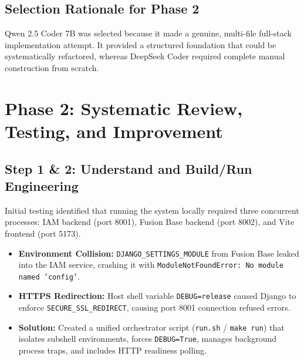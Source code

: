 \documentclass[11pt,a4paper]{article}
\begin{document}
\subsection{Selection Rationale for Phase 2}
Qwen 2.5 Coder 7B was selected because it made a genuine, multi-file full-stack implementation attempt. It provided a structured foundation that could be systematically refactored, whereas DeepSeek Coder required complete manual construction from scratch.

\section{Phase 2: Systematic Review, Testing, and Improvement}

\subsection{Step 1 \& 2: Understand and Build/Run Engineering}
Initial testing identified that running the system locally required three concurrent processes: IAM backend (port 8001), Fusion Base backend (port 8002), and Vite frontend (port 5173).
\begin{itemize}[noitemsep,topsep=2pt]
    \item \textbf{Environment Collision:} \texttt{DJANGO\_SETTINGS\_MODULE} from Fusion Base leaked into the IAM service, crashing it with \texttt{ModuleNotFoundError: No module named 'config'}.
    \item \textbf{HTTPS Redirection:} Host shell variable \texttt{DEBUG=release} caused Django to enforce \texttt{SECURE\_SSL\_REDIRECT}, causing port 8001 connection refused errors.
    \item \textbf{Solution:} Created a unified orchestrator script (\texttt{run.sh} / \texttt{make run}) that isolates subshell environments, forces \texttt{DEBUG=True}, manages background process traps, and includes HTTP readiness polling.
\end{itemize}
\end{document}
